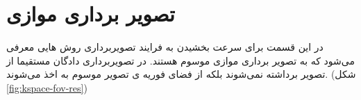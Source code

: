 \section{تصویر برداری موازی}

در این قسمت برای سرعت بخشیدن به فرایند تصویربرداری \mri روش هایی معرفی می‌شود که به تصویر برداری موازی 
موسوم هستند.
در تصویربرداری \mri دادگان مستقیما از تصویر برداشته نمی‌شوند بلکه از فضای فوریه ‌ی تصویر موسوم به \kspace اخذ می‌شوند. (شکل \ref{fig:kspace-fov-res})






\begin{figure}[t!]
	\centering
	\begin{RTLcopyrightBox}{\linewidth}{}
		\hfill
\end{RTLcopyrightBox}
\end{figure}
